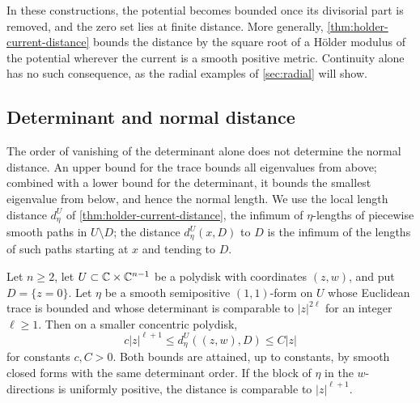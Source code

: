 In these constructions, the potential becomes bounded once its divisorial part is removed, and the zero set lies at finite distance. More generally, \cref{thm:holder-current-distance} bounds the distance by the square root of a H\"older modulus of the potential wherever the current is a smooth positive metric. Continuity alone has no such consequence, as the radial examples of \cref{sec:radial} will show.

\subsection{Determinant and normal distance}

The order of vanishing of the determinant alone does not determine the normal distance. An upper bound for the trace bounds all eigenvalues from above; combined with a lower bound for the determinant, it bounds the smallest eigenvalue from below, and hence the normal length. We use the local length distance $d_\eta^U$ of \cref{thm:holder-current-distance}, the infimum of $\eta$-lengths of piecewise smooth paths in $U\setminus D$; the distance $d^U_\eta(x,D)$ to $D$ is the infimum of the lengths of such paths starting at $x$ and tending to $D$.

\begin{proposition}\label{prop:determinant-limits}
Let $n\geq2$, let $U\subset\mathbb C\times\mathbb C^{n-1}$ be a polydisk with coordinates $(z,w)$, and put $D=\{z=0\}$. Let $\eta$ be a smooth semipositive $(1,1)$-form on $U$ whose Euclidean trace is bounded and whose determinant is comparable to $|z|^{2\ell}$ for an integer $\ell\geq1$. Then on a smaller concentric polydisk,
\begin{equation}\label{eq:determinant-distance-range}
 c|z|^{\ell+1}\leq d_\eta^U((z,w),D)\leq C|z|
\end{equation}
for constants $c,C>0$. Both bounds are attained, up to constants, by smooth closed forms with the same determinant order. If the block of $\eta$ in the $w$-directions is uniformly positive, the distance is comparable to $|z|^{\ell+1}$.
\end{proposition}

